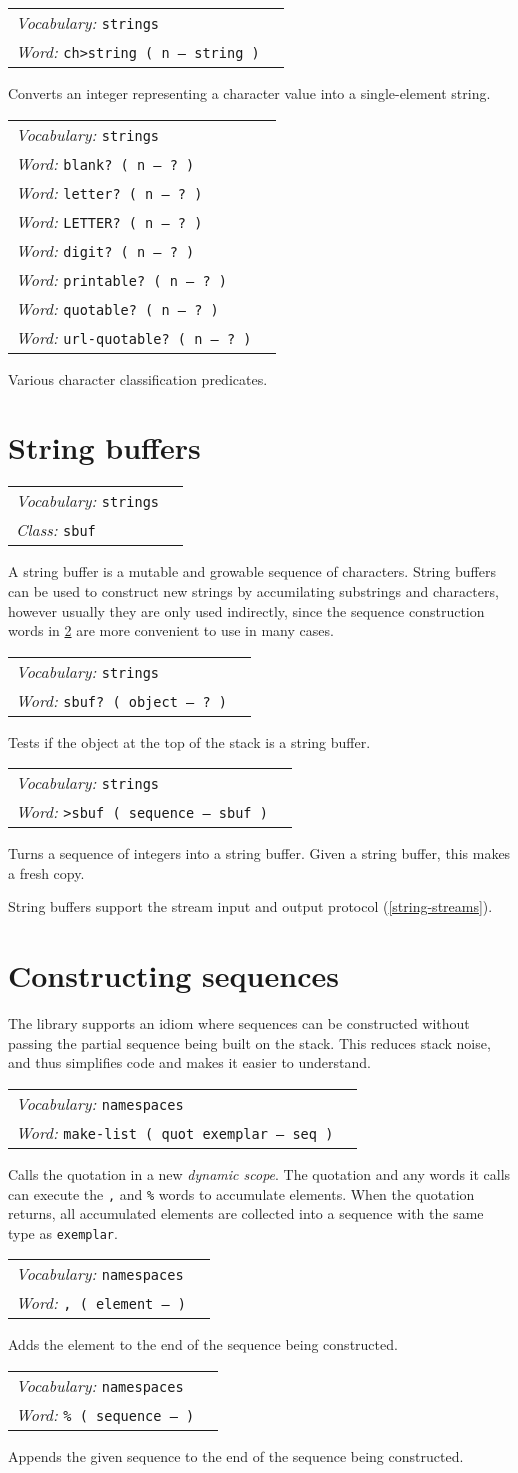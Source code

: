 \documentclass{book}
\newcommand{\vocabulary}[1]{\emph{Vocabulary:} \texttt{#1}&\\}
\newcommand{\ordinaryword}[2]{\index{\texttt{#1}}\emph{Word:} \texttt{#2}&\\}
\newcommand{\classword}[1]{\index{\texttt{#1}}\emph{Class:} \texttt{#1}&\\}
\newcommand{\wordtable}[1]{


\begin{tabularx}{12cm}{lX}
\hline
#1
\hline
\end{tabularx}

}
\begin{document}
\wordtable{
\vocabulary{strings}
\ordinaryword{ch>string}{ch>string ( n -- string )}
}
Converts an integer representing a character value into a single-element string.
\wordtable{
\vocabulary{strings}
\ordinaryword{blank?}{blank?~( n -- ?~)}
\ordinaryword{letter?}{letter?~( n -- ?~)}
\ordinaryword{LETTER?}{LETTER?~( n -- ?~)}
\ordinaryword{digit?}{digit?~( n -- ?~)}
\ordinaryword{printable?}{printable?~( n -- ?~)}
\ordinaryword{quotable?}{quotable?~( n -- ?~)}
\ordinaryword{url-quotable?}{url-quotable?~( n -- ?~)}
}
Various character classification predicates.

\section{String buffers}\label{string-buffers}

\sbufglos
\wordtable{
\vocabulary{strings}
\classword{sbuf}
}
A string buffer is a mutable and growable sequence of characters. String buffers can be used to construct new strings by accumilating substrings and characters, however usually they are only used indirectly, since the sequence construction words in \ref{make-seq} are more convenient to use in many cases.
\wordtable{
\vocabulary{strings}
\ordinaryword{sbuf?}{sbuf?~( object -- ?~)}
}
Tests if the object at the top of the stack is a string buffer.
\wordtable{
\vocabulary{strings}
\ordinaryword{>sbuf}{>sbuf~( sequence -- sbuf )}
}
Turns a sequence of integers into a string buffer. Given a string buffer, this makes a fresh copy.

String buffers support the stream input and output protocol (\ref{string-streams}).

\section{Constructing sequences}\label{make-seq}

The library supports an idiom where sequences can be constructed without passing the partial sequence being built on the stack. This reduces stack noise, and thus simplifies code and makes it easier to understand.

\newcommand{\dynamicscopeglos}{}
\dynamicscopeglos
\wordtable{
\vocabulary{namespaces}
\ordinaryword{make}{make-list ( quot exemplar -- seq )}
}
Calls the quotation in a new \emph{dynamic scope}. The quotation and any words it calls can execute the \texttt{,} and \texttt{\%} words to accumulate elements. When the quotation returns, all accumulated elements are collected into a sequence with the same type as \verb|exemplar|.
\wordtable{
\vocabulary{namespaces}
\ordinaryword{,}{,~( element -- )}
}
Adds the element to the end of the sequence being constructed.
\wordtable{
\vocabulary{namespaces}
\ordinaryword{\%}{\% ( sequence -- )}
}
Appends the given sequence to the end of the sequence being constructed.
\end{document}
